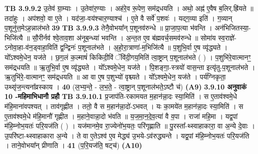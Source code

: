 \documentclass[17pt]{extarticle}
\begin{document}
{{{{{{{{{{{{{{{{{{{{{{                  \newline
                                \textbf{ TB 3.9.9.2} \newline
                  उ॒तेव॑ ग्रा॒म्याः । उ॒तेवा॑र॒ण्याः । अह॑रे॒व रू॒पेण॒ सम॑द्र्धयति । अथो॒ अह्न॑ ए॒वैष ब॒लिर्.ह्रि॑यते ॥ तदा॑हुः । अप॑शवो॒ वा ए॒ते । यद॑जा॒-वय॑श्चार॒ण्याश्च॑ । ए॒ते वै सर्वे॑ प॒शवः॑ । यद्ग॒व्या इति॑ । ग॒व्यान् प॒शूनु॑त्त॒मेऽह॒न्नाल॑भते \textbf{ 39} \newline
                  \newline
                                \textbf{ TB 3.9.9.3} \newline
                  तेनै॒वोभया᳚न् प॒शूनव॑रुन्धे ॥ प्रा॒जा॒प॒त्या भ॑वन्ति । अन॑भिजितस्या॒-भिजि॑त्यै ॥ सौ॒रीर्नव॑ श्वे॒ताव॒शा अ॑नूब॒न्ध्या॑ भवन्ति । अ॒न्त॒त ए॒व ब॑ह्मवर्च॒समव॑रुन्धे ॥ सोमा॑य स्व॒राज्ञे॑-ऽनोवा॒हा-व॑न॒ड्वाहा॒विति॑ द्व॒न्द्विनः॑ प॒शूनाल॑भते । अ॒हो॒रा॒त्राणा॑-म॒भिजि॑त्यै ॥ प॒शुभि॒र्वा ए॒ष व्यृ॑द्ध्यते । यो᳚ऽश्वमे॒धेन॒ यज॑ते । छ॒ग॒लं क॒ल्माषं॑ किकिदी॒विं ॅवि॑दी॒गय॒मिति॑ त्वा॒ष्ट्रान् प॒शूनाल॑भते ( ) । प॒शुभि॑रे॒वात्मानꣳ॒॒ सम॑द्र्धयति ॥ ऋ॒तुभि॒र्वा ए॒ष व्यृ॑द्ध्यते । यो᳚ऽश्वमे॒धेन॒ यज॑ते । पि॒शङ्गा॒-स्त्रयो॑ वास॒न्ता इत्यृ॑तु-प॒शूनाल॑भते । ऋ॒तुभि॑रे॒-वात्मानꣳ॒॒ सम॑द्र्धयति ॥ आ वा ए॒ष प॒शुभ्यो॑ वृश्च्यते । यो᳚ऽश्वमे॒धेन॒ यज॑ते । पर्य॑ग्निकृता॒ उथ्सृ॑ज॒न्त्यना᳚व्रस्काय । \textbf{ 40} \newline
                  \newline
                                    (ल॒भ्य॒न्ते॒ - ल॒भ॒ते॒ - त्वा॒ष्ट्रान् प॒शूनाल॑भते॒ऽष्टौ च॑) \textbf{(A9)} \newline \newline
                \textbf{ 3.9.10    अनुवाकं   10 -महिमाभिधानौ प्रहौ} \newline
                                \textbf{ TB 3.9.10.1} \newline
                  प्र॒जाप॑ति-रकामयत म॒हान॑न्ना॒दः स्या॒मिति॑ । स ए॒ताव॑श्वमे॒धे म॑हि॒माना॑वपश्यत् । ताव॑गृह्णीत । ततो॒ वै स म॒हान॑न्ना॒दो॑-ऽभवत् । यः का॒मये॑त म॒हान॑न्ना॒दः स्या॒मिति॑ । स ए॒ताव॑श्वमे॒धे म॑हि॒मानौ॑ गृह्णीत । म॒हाने॒वान्ना॒दो भ॑वति ॥ य॒ज॒मा॒न॒दे॒व॒त्या॑ वै व॒पा । राजा॑ महि॒मा । यद्व॒पां म॑हि॒म्नोभ॒यतः॑ परि॒यज॑ति ( ) । यज॑मानमे॒व रा॒ज्येनो॑भ॒यतः॒ परि॑गृह्णाति ॥ पु॒रस्ता᳚-थ्स्वाहाकारा॒ वा अ॒न्ये दे॒वाः । उ॒परि॑ष्टा-थ्स्वाहाकारा अ॒न्ये । ते वा ए॒तेऽश्व॑ ए॒व मेद्ध्य॑ उ॒भये-ऽव॑रुद्ध्यन्ते । यद्व॒पां म॑हि॒म्नोभ॒यतः॑ परि॒यज॑ति । ताने॒वोभया᳚न् प्रीणाति । \textbf{ 41} \newline
                  \newline
                                    (प॒रि॒यज॑ति॒ षट्च॑) \textbf{(A10)} \newline \newline
}}}}}}}}}}}}}}}}}}}}}}
\end{document}
